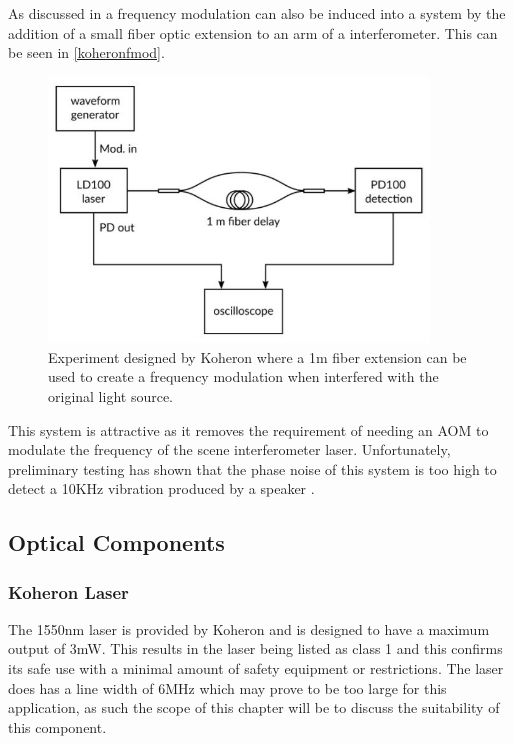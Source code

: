 \documentclass[12pt,a4paper,oneside]{report}
\begin{document}

As discussed in \cite{KoheronAmplitudeKoheron} a frequency modulation can also be induced into a system by the addition of a small fiber optic extension to an arm of a interferometer. This can be seen in \autoref{koheronfmod}.

\begin{figure}[H]
\includegraphics[width=0.9\textwidth, center,angle=0]{DImages/koheronfmod.JPG}
\caption{Experiment designed by Koheron where a 1m fiber extension can be used to create a frequency modulation when interfered with the original light source.}
\label{koheronfmod}
\end{figure}

This system is attractive as it removes the requirement of needing an AOM to modulate the frequency of the scene interferometer laser. Unfortunately, preliminary testing has shown that the phase noise of this system is too high to detect a 10KHz vibration produced by a speaker \cite{Hickling2017InvestigationMAST-U}.

\subsection{Optical Components}

\subsubsection{Koheron Laser}
The 1550nm laser \cite{KoheronLaserV1} is provided by Koheron and is designed to have a maximum output of 3mW. This results in the laser being listed as class 1 and this confirms its safe use with a minimal amount of safety equipment or restrictions. The laser does has a line width of 6MHz which may prove to be too large for this application, as such the scope of this chapter will be to discuss the suitability of this component.
\end{document}
